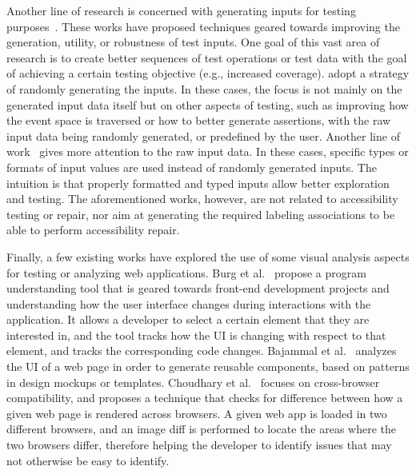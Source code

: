 Another line of research is concerned with generating inputs for 
testing purposes~\cite{adamo2018combinatorial,su2017guided}. 
These works have proposed techniques geared towards improving 
the generation, utility, or robustness of test inputs. 
One goal of this vast area of research is to create better 
sequences of test operations or test data with the goal of 
achieving a certain testing objective (e.g., increased coverage). 
\cite{song2017ehb, sadeghi2017pat} adopt a strategy 
of randomly generating the inputs. 
In these cases, the focus is not mainly on the generated input 
data itself but on other aspects of testing, such as improving 
how the event space is traversed or how to better generate 
assertions, with the raw input data being randomly generated, 
or predefined by the user. Another line of work~\cite{arnatovich2018mobolic, 
dhok2016type} gives more attention to the raw input data. 
In these cases, specific types or formats of input values 
are used instead of randomly generated inputs. 
The intuition is that properly formatted and typed inputs 
allow better exploration and testing. 
The aforementioned works, however, are not related to accessibility 
testing or repair, nor aim at generating the required labeling 
associations to be able to perform accessibility repair.  

Finally, a few existing works have explored the use of some visual analysis 
aspects for testing or analyzing web applications. 
Burg et al.~\cite{burg2015explaining} propose a program understanding tool 
that is geared towards front-end development projects and understanding how 
the user interface changes during interactions with the application. It allows 
a developer to select a certain element that 
they are interested in, and the tool tracks how the UI is changing with respect to 
that element, and tracks the corresponding code changes. 
Bajammal et al.~\cite{bajammal2018generating} analyzes the UI of a web page in 
order to generate reusable components, based on patterns in design mockups or templates.  
Choudhary et al.~\cite{choudhary2012crosscheck} focuses on cross-browser 
compatibility, and proposes a technique that checks for difference between 
how a given web page is rendered across browsers. A given web app is loaded in two 
different browsers, and an image diff is performed to locate the areas where 
the two browsers differ, therefore helping the developer to identify issues 
that may not otherwise be easy to identify. 

